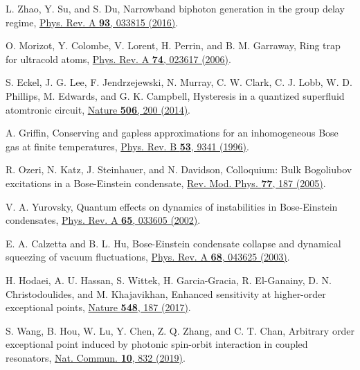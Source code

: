 \documentclass[twocolumn,prl,floatfix,citeautoscript,nofootinbib,superscriptaddress]{revtex4}
\begin{document}
\begin{thebibliography}{99}
 L. Zhao, Y. Su, and S. Du, Narrowband biphoton generation
in the group delay regime, \href{https://doi.org/10.1103/PhysRevA.93.033815}{%
Phys. Rev. A \textbf{93}, 033815 (2016)}.


 O. Morizot, Y. Colombe, V. Lorent, H. Perrin,
and B. M. Garraway, Ring trap for ultracold atoms, \href{https://doi.org/10.1103/PhysRevA.74.023617}%
{Phys. Rev. A \textbf{74}, 023617 (2006)}.

 S. Eckel, J. G. Lee, F. Jendrzejewski, N. Murray, C.
W. Clark, C. J. Lobb, W. D. Phillips, M. Edwards, and G. K. Campbell,
Hysteresis in a quantized superfluid atomtronic circuit, \href{https://doi.org/10.1038/nature12958}%
{Nature \textbf{506}, 200 (2014)}.

 A. Griffin, Conserving and gapless approximations
for an inhomogeneous Bose gas at finite temperatures, \href{https://doi.org/10.1103/PhysRevB.53.9341}%
{Phys. Rev. B \textbf{53}, 9341 (1996)}.

 R. Ozeri, N. Katz, J. Steinhauer, and N.
Davidson, Colloquium: Bulk Bogoliubov excitations in a Bose-Einstein
condensate, \href{https://doi.org/10.1103/RevModPhys.77.187}{Rev. Mod. Phys.
\textbf{77}, 187 (2005)}.

 V. A. Yurovsky, Quantum effects on dynamics of
instabilities in Bose-Einstein condensates, \href{https://doi.org/10.1103/PhysRevA.65.033605}%
{Phys. Rev. A \textbf{65}, 033605 (2002)}.

 E. A. Calzetta and B. L. Hu, Bose-Einstein
condensate collapse and dynamical squeezing of vacuum fluctuations, \href{https://doi.org/10.1103/PhysRevA.68.043625}%
{Phys. Rev. A \textbf{68}, 043625 (2003)}.


 H. Hodaei, A. U. Hassan, S. Wittek, H. Garcia-Gracia,
R. El-Ganainy, D. N. Christodoulides, and M. Khajavikhan, Enhanced
sensitivity at higher-order exceptional points, \href{https://doi.org/10.1038/nature23280}%
{Nature \textbf{548}, 187 (2017)}.

 S. Wang, B. Hou, W. Lu, Y. Chen, Z. Q. Zhang,
and C. T. Chan, Arbitrary order exceptional point induced by photonic
spin-orbit interaction in coupled resonators, \href{https://doi.org/10.1038/s41467-019-08826-6}%
{Nat. Commun. \textbf{10}, 832 (2019)}.

\end{thebibliography}
\end{document}
